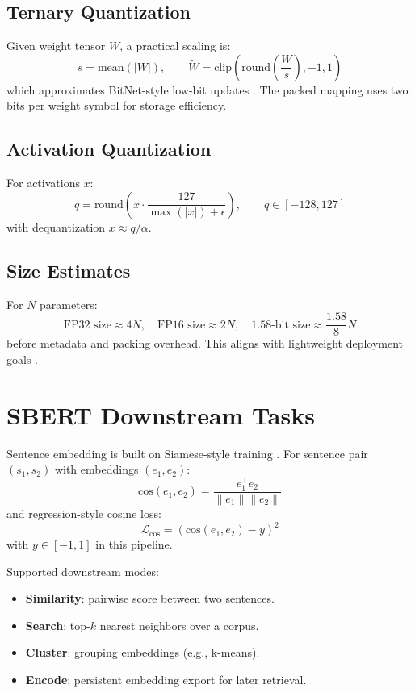 \documentclass[11pt,a4paper]{article}
\begin{document}
\subsection{Ternary Quantization}
Given weight tensor $W$, a practical scaling is:
\[
s=\text{mean}(|W|),\qquad
\tilde{W}=\text{clip}\left(\text{round}\left(\frac{W}{s}\right),-1,1\right)
\]
which approximates BitNet-style low-bit updates \citep{wang_bitnet_2023}. The packed mapping uses two bits per weight symbol for storage efficiency.

\subsection{Activation Quantization}
For activations $x$:
\[
q=\text{round}\left(x\cdot\frac{127}{\max(|x|)+\epsilon}\right),\qquad q\in[-128,127]
\]
with dequantization $x\approx q/\alpha$.

\subsection{Size Estimates}
For $N$ parameters:
\[
\text{FP32 size}\approx 4N,\quad \text{FP16 size}\approx 2N,\quad \text{1.58-bit size}\approx \frac{1.58}{8}N
\]
before metadata and packing overhead. This aligns with lightweight deployment goals \citep{samson_lightweight_2026,bravin_embbert_2026}.

\section{SBERT Downstream Tasks}
\label{sec:sbert}

Sentence embedding is built on Siamese-style training \citep{reimers_sentence-bert_2019}. For sentence pair $(s_1,s_2)$ with embeddings $(e_1,e_2)$:
\[
\text{cos}(e_1,e_2)=\frac{e_1^\top e_2}{\|e_1\|\|e_2\|}
\]
and regression-style cosine loss:
\[
\mathcal{L}_{\text{cos}}=\left(\text{cos}(e_1,e_2)-y\right)^2
\]
with $y\in[-1,1]$ in this pipeline.

Supported downstream modes:
\begin{itemize}[leftmargin=*]
    \item \textbf{Similarity}: pairwise score between two sentences.
    \item \textbf{Search}: top-$k$ nearest neighbors over a corpus.
    \item \textbf{Cluster}: grouping embeddings (e.g., k-means).
    \item \textbf{Encode}: persistent embedding export for later retrieval.
\end{itemize}
\end{document}
